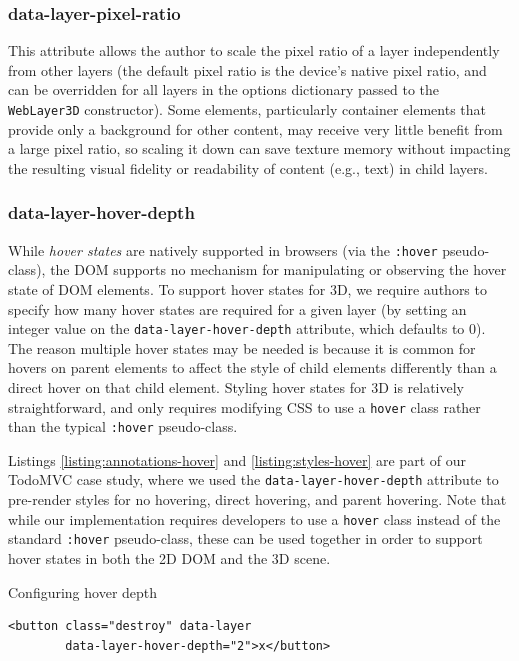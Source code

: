 \documentclass[sigconf]{acmart}
\begin{document}
\subsubsection{data-layer-pixel-ratio}
This attribute allows the author to scale the pixel ratio of a layer independently from other layers (the default pixel ratio is the device's native pixel ratio, and can be overridden for all layers in the options dictionary passed to the \verb|WebLayer3D| constructor). Some elements, particularly container elements that provide only a background for other content, may receive very little benefit from a large pixel ratio, so scaling it down can save texture memory without impacting the resulting visual fidelity or readability of content (e.g., text) in child layers. 

\subsubsection{data-layer-hover-depth}
While \textit{hover states} are natively supported in browsers (via the \verb|:hover| pseudo-class), the DOM supports no mechanism for manipulating or observing the hover state of DOM elements. To support hover states for 3D, we require authors to specify how many hover states are required for a given layer (by setting an integer value on the \verb|data-layer-hover-depth| attribute, which defaults to 0). The reason multiple hover states may be needed is because it is common for hovers on parent elements to affect the style of child elements differently than a direct hover on that child element. Styling hover states for 3D is relatively straightforward, and only requires modifying CSS to use a \verb|hover| class rather than the typical \verb|:hover| pseudo-class. 

Listings \ref{listing:annotations-hover} and \ref{listing:styles-hover} are part of our TodoMVC case study, where we used the \verb|data-layer-hover-depth| attribute to pre-render styles for no hovering, direct hovering, and parent hovering. Note that while our implementation requires developers to use a \verb|hover| class instead of the standard \verb|:hover| pseudo-class, these can be used together in order to support hover states in both the 2D DOM and the 3D scene.

\begin{listing}[H]
\caption{Configuring hover depth}
\label{listing:annotations-hover}
\begin{verbatim}
<button class="destroy" data-layer 
        data-layer-hover-depth="2">x</button>
\end{verbatim}
\end{listing}
\end{document}
